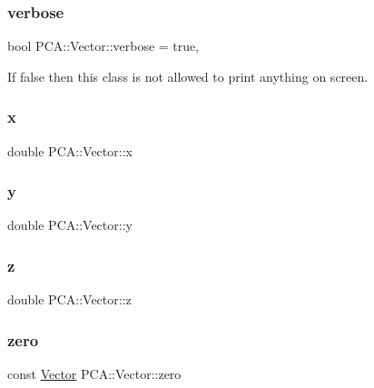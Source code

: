 \subsubsection{\texorpdfstring{verbose}{verbose}}
{\footnotesize\ttfamily bool P\+C\+A\+::\+Vector\+::verbose = true\hspace{0.3cm}{\ttfamily [static]}, {\ttfamily [private]}}



If false then this class is not allowed to print anything on screen. 

\hypertarget{class_p_c_a_1_1_vector_ac14a3d674fa7956b18a7e2b25aa9b4bb}{}\label{class_p_c_a_1_1_vector_ac14a3d674fa7956b18a7e2b25aa9b4bb} 
\subsubsection{\texorpdfstring{x}{x}}
{\footnotesize\ttfamily double P\+C\+A\+::\+Vector\+::x}

\hypertarget{class_p_c_a_1_1_vector_a75d5d6af0e3f847456d54412b86c53c0}{}\label{class_p_c_a_1_1_vector_a75d5d6af0e3f847456d54412b86c53c0} 
\subsubsection{\texorpdfstring{y}{y}}
{\footnotesize\ttfamily double P\+C\+A\+::\+Vector\+::y}

\hypertarget{class_p_c_a_1_1_vector_a715bde094c7e430c9c39769f6790b835}{}\label{class_p_c_a_1_1_vector_a715bde094c7e430c9c39769f6790b835} 
\subsubsection{\texorpdfstring{z}{z}}
{\footnotesize\ttfamily double P\+C\+A\+::\+Vector\+::z}

\hypertarget{class_p_c_a_1_1_vector_a72264553beba4bb7c7a3cea65d4bbd4f}{}\label{class_p_c_a_1_1_vector_a72264553beba4bb7c7a3cea65d4bbd4f} 
\subsubsection{\texorpdfstring{zero}{zero}}
{\footnotesize\ttfamily const \hyperlink{class_p_c_a_1_1_vector}{Vector} P\+C\+A\+::\+Vector\+::zero\hspace{0.3cm}{\ttfamily [static]}}



